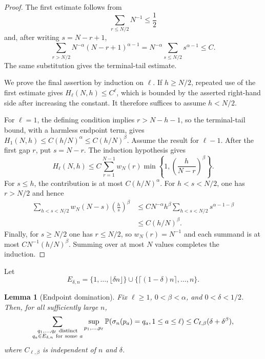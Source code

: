 \documentclass[11pt]{article}
\newtheorem{lemma}[theorem]{Lemma}
\theoremstyle{remark}
\newcommand{\Pp}{\mathbb P}
\begin{document}
\begin{proof}
The first estimate follows from
\[
 \sum_{r\le N/2}N^{-1}\le\frac12
\]
and, after writing $s=N-r+1$,
\[
 \sum_{r>N/2}N^{-\alpha}(N-r+1)^{\alpha-1}
 =N^{-\alpha}\sum_{s\le N/2}s^{\alpha-1}\le C.
\]
The same substitution gives the terminal-tail estimate.

We prove the final assertion by induction on $\ell$.  If $h\ge N/2$, repeated
use of the first estimate gives $H_\ell(N,h)\le C^\ell$, which is bounded by
the asserted right-hand side after increasing the constant.  It therefore
suffices to assume $h<N/2$.

For $\ell=1$, the defining condition implies $r>N-h-1$, so the terminal-tail
bound, with a harmless endpoint term, gives
$H_1(N,h)\le C(h/N)^\alpha\le C(h/N)^\beta$.
Assume the result for $\ell-1$.  After the first gap $r$, put $s=N-r$.
The induction hypothesis gives
\[
 H_\ell(N,h)
 \le C\sum_{r=1}^{N-1}w_N(r)
 \min\left\{1,\left(\frac h{N-r}\right)^\beta\right\}.
\]
For $s\le h$, the contribution is at most $C(h/N)^\alpha$.  For
$h<s<N/2$, one has $r>N/2$ and hence
\[
\begin{aligned}
 \sum_{h<s<N/2}w_N(N-s)\left(\frac hs\right)^\beta
 &\le C N^{-\alpha}h^\beta
 \sum_{h<s<N/2}s^{\alpha-1-\beta}\\
 &\le C(h/N)^\beta.
\end{aligned}
\]
Finally, for $s\ge N/2$ one has $r\le N/2$, so $w_N(r)=N^{-1}$ and each
summand is at most $CN^{-1}(h/N)^\beta$.  Summing over at most $N$ values
completes the induction.
\end{proof}

Let
\[
        E_{\delta,n}
        =\{1,\ldots,\lfloor\delta n\rfloor\}
        \cup
        \{\lceil(1-\delta)n\rceil,\ldots,n\}.
\]

\begin{lemma}[Endpoint domination]\label{lem:endpoint-dom}
Fix \(\ell\ge1\), \(0<\beta<\alpha\), and \(0<\delta<1/2\).  Then, for all sufficiently large \(n\),
\[
\sum_{\substack{q_1,
\ldots,q_\ell\ {\rm distinct}\\
q_a\in E_{\delta,n}\ {\rm for\ some}\ a}}
\sup_{p_1,
\ldots,p_\ell}
\Pp(\sigma_n(p_a)=q_a,1\le a\le\ell)
\le C_{\ell,\beta}(\delta+\delta^\beta),
\]
where \(C_{\ell,\beta}\) is independent of \(n\) and \(\delta\).
\end{lemma}
\end{document}

